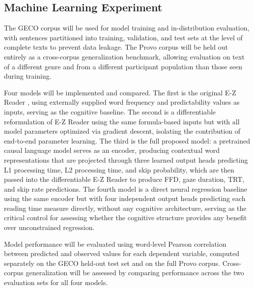 \documentclass[12pt]{article}
\begin{document}
\subsection{Machine Learning Experiment}

The GECO corpus will be used for model training and in-distribution evaluation,
with sentences partitioned into training, validation, and test sets at the
level of complete texts to prevent data leakage. The Provo corpus will be held
out entirely as a cross-corpus generalization benchmark, allowing evaluation on
text of a different genre and from a different participant population than those
seen during training.

Four models will be implemented and compared. The first is the original E-Z
Reader \citep{reichle1998toward}, using externally supplied word frequency and
predictability values as inputs, serving as the cognitive baseline. The second
is a differentiable reformulation of E-Z Reader using the same formula-based
inputs but with all model parameters optimized via gradient descent, isolating
the contribution of end-to-end parameter learning. The third is the full
proposed model: a pretrained causal language model serves as an encoder,
producing contextual word representations that are projected through three
learned output heads predicting L1 processing time, L2 processing time, and
skip probability, which are then passed into the differentiable E-Z Reader to
produce FFD, gaze duration, TRT, and skip rate predictions. The fourth model is
a direct neural regression baseline using the same encoder but with four
independent output heads predicting each reading time measure directly, without
any cognitive architecture, serving as the critical control for assessing
whether the cognitive structure provides any benefit over unconstrained
regression.

Model performance will be evaluated using word-level Pearson correlation
between predicted and observed values for each dependent variable, computed
separately on the GECO held-out test set and on the full Provo corpus.
Cross-corpus generalization will be assessed by comparing performance across
the two evaluation sets for all four models.

\newpage


\end{document}
